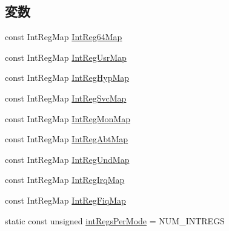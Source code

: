 \subsection*{変数}
\begin{DoxyCompactItemize}
\item 
const IntRegMap \hyperlink{namespaceArmISA_a61b59765372fd10a3c306de953063e1c}{IntReg64Map}
\item 
const IntRegMap \hyperlink{namespaceArmISA_a429a1b4e729321ba6e26f9d5431eb0b4}{IntRegUsrMap}
\item 
const IntRegMap \hyperlink{namespaceArmISA_ab02560f4c45ccebd140d1ee0dafd8f99}{IntRegHypMap}
\item 
const IntRegMap \hyperlink{namespaceArmISA_a36508dcad6bb74839a7c80a03f7aeaeb}{IntRegSvcMap}
\item 
const IntRegMap \hyperlink{namespaceArmISA_a8dbc1fb5a7a205452b8d70872a999abb}{IntRegMonMap}
\item 
const IntRegMap \hyperlink{namespaceArmISA_ac759f403b33941374fc2f5c727e6dc38}{IntRegAbtMap}
\item 
const IntRegMap \hyperlink{namespaceArmISA_aca4e9cd55af6ac65f87443d2fe738af8}{IntRegUndMap}
\item 
const IntRegMap \hyperlink{namespaceArmISA_a4ebe19e65b77b6992d444734970a6cc3}{IntRegIrqMap}
\item 
const IntRegMap \hyperlink{namespaceArmISA_ad9e04f768864ec44080110584aef455c}{IntRegFiqMap}
\item 
static const unsigned \hyperlink{namespaceArmISA_a5e091efcd31396ee0eb4010a6f1774f3}{intRegsPerMode} = NUM\_\-INTREGS
\end{DoxyCompactItemize}
